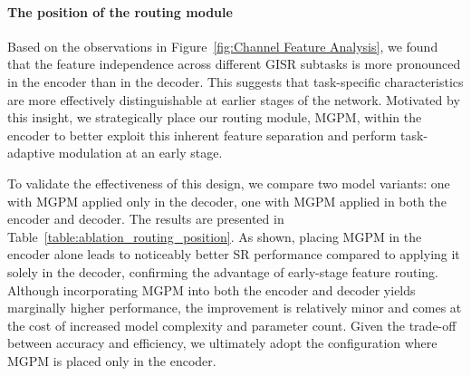 \documentclass[lettersize,journal]{IEEEtran}
\begin{document}







\paragraph{The position of the routing module}
Based on the observations in Figure~\ref{fig:Channel Feature Analysis}, we found that the feature independence across different GISR subtasks is more pronounced in the encoder than in the decoder. This suggests that task-specific characteristics are more effectively distinguishable at earlier stages of the network. Motivated by this insight, we strategically place our routing module, MGPM, within the encoder to better exploit this inherent feature separation and perform task-adaptive modulation at an early stage.



To validate the effectiveness of this design, we compare two model variants: one with MGPM applied only in the decoder, one with MGPM applied in both the encoder and decoder. The results are presented in Table~\ref{table:ablation_routing_position}. As shown, placing MGPM in the encoder alone leads to noticeably better SR performance compared to applying it solely in the decoder, confirming the advantage of early-stage feature routing.
Although incorporating MGPM into both the encoder and decoder yields marginally higher performance, the improvement is relatively minor and comes at the cost of increased model complexity and parameter count. Given the trade-off between accuracy and efficiency, we ultimately adopt the configuration where MGPM is placed only in the encoder. 
\end{document}
